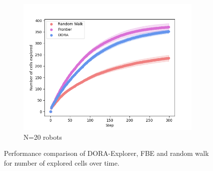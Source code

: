 \documentclass[letterpaper, 10 pt, conference]{ieeeconf}
\begin{document}
\begin{figure}
\begin{subfigure}{0.32\textwidth}
        \includegraphics[width=\textwidth]{images/explored_20.png}
        \caption{N=20 robots}
        \label{results:explored20}
    \end{subfigure}
    \caption{Performance comparison of DORA-Explorer, FBE and random walk for number of explored cells over time.}
\end{figure}
\end{document}
